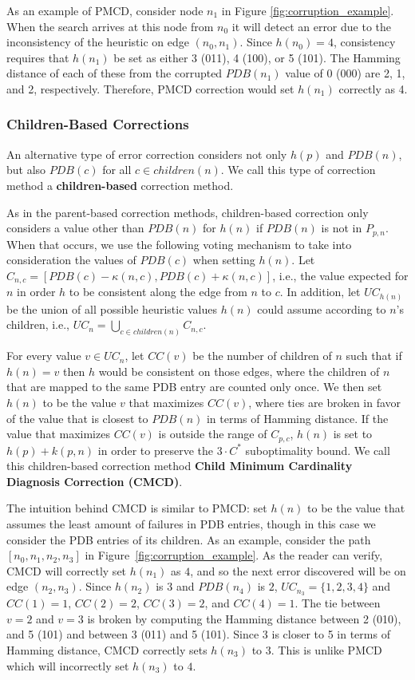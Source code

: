 \documentclass[letterpaper]{article}
\begin{document}
As an example of PMCD, consider node $n_1$ in Figure \ref{fig:corruption_example}. When the search arrives at this node from $n_0$ it will detect an error due to the inconsistency of the heuristic on edge $(n_0, n_1)$.
Since $h(n_0)=4$, consistency requires that $h(n_1)$ be set as either 3 (011), 4 (100), or 5 (101). The Hamming distance of each of these from the corrupted $PDB(n_1)$ value of 0 (000) are 2, 1, and 2, respectively.
Therefore, PMCD correction would set $h(n_1)$ correctly as 4.

\subsubsection{Children-Based Corrections}

An alternative type of error correction considers not only $h(p)$ and $PDB(n)$, but also $PDB(c)$ for all $c \in children(n)$. We call this type of correction method a \textbf{children-based} correction method.

As in the parent-based correction methods, children-based correction only considers a value other than $PDB(n)$ for $h(n)$ if $PDB(n)$ is not in $P_{p,n}$. When that occurs, we use the following voting mechanism to take into consideration the values of $PDB(c)$ when setting $h(n)$.
Let $C_{n,c}=[PDB(c)-\kappa(n,c),PDB(c)+\kappa(n,c)]$, i.e., the value expected for $n$ in order $h$ to be consistent along the edge from $n$ to $c$. In addition, let $UC_{h(n)}$ be the union of all possible heuristic values $h(n)$ could assume according to $n$'s children, i.e., $UC_n = \bigcup_{c \in children(n)} C_{n,c}$.

For every value $v\in UC_n$, let $CC(v)$ be the number of children of $n$ such that if $h(n)=v$ then $h$ would be consistent on those edges, where the children of $n$ that are mapped to the same PDB entry are counted only once. We then set $h(n)$ to be the value $v$ that maximizes $CC(v)$, where ties are broken in favor of the value that is closest to $PDB(n)$ in terms of Hamming distance.
If the value that maximizes $CC(v)$ is outside the range of $C_{p,c}$, $h(n)$ is set to $h(p) + k(p, n)$ in order to preserve the $3 \cdot C^*$ suboptimality bound.
We call this children-based correction method \textbf{Child Minimum Cardinality Diagnosis Correction (CMCD)}.

The intuition behind CMCD is similar to PMCD: set $h(n)$ to be the value that assumes the least amount of failures in PDB entries, though in this case we consider the PDB entries of its children.
As an example, consider the path $[n_0, n_1, n_2, n_3]$ in Figure~\ref{fig:corruption_example}.
As the reader can verify, CMCD will correctly set $h(n_1)$ as $4$, and so the next error discovered will be on edge $(n_2, n_3)$.
Since $h(n_2)$ is $3$  and $PDB(n_4)$ is $2$, $UC_{n_3} = \{1, 2, 3, 4\}$ and $CC(1)=1$, $CC(2)=2$, $CC(3)=2$, and $CC(4)=1$.
The tie between $v=2$ and $v=3$ is broken by computing the Hamming distance between 2 (010), and 5 (101) and between 3 (011) and 5 (101). Since 3 is closer to 5 in terms of Hamming distance, CMCD correctly sets $h(n_3)$ to $3$.
This is unlike PMCD which will incorrectly set $h(n_3)$ to $4$.
\end{document}
